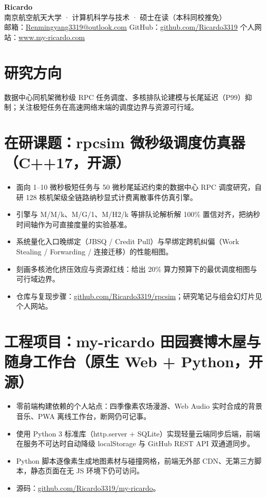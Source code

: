 \documentclass[11pt,a4paper]{article}
\begin{document}
{\Huge\bfseries Ricardo}\\[5pt]
{\large 南京航空航天大学 · 计算机科学与技术 · 硕士在读（本科同校推免）}\\[4pt]
{\small\color{soft}
  邮箱：\href{mailto:Renmingyang3319@outlook.com}{Renmingyang3319@outlook.com} \quad
  GitHub：\href{https://github.com/Ricardo3319}{github.com/Ricardo3319} \quad
  个人网站：\href{https://www.my-ricardo.com}{www.my-ricardo.com}
}

\section{研究方向}
数据中心同机架微秒级 RPC 任务调度、多核排队论建模与长尾延迟（P99）抑制；关注极短任务在高速网络末端的调度边界与资源可行域。

\section{在研课题：rpcsim 微秒级调度仿真器（C++17，开源）}
\begin{itemize}
  \item 面向 1--10 微秒极短任务与 50 微秒尾延迟约束的数据中心 RPC 调度研究，自研 128 核机架级全链路纳秒显式计费离散事件仿真引擎。
  \item 引擎与 M/M/k、M/G/1、M/H2/k 等排队论解析解 100\% 置信对齐，把纳秒时间轴作为可直接度量的实验基准。
  \item 系统量化入口晚绑定（JBSQ / Credit Pull）与早绑定跨机纠偏（Work Stealing / Forwarding / 连接迁移）的性能相图。
  \item 刻画多核池化挤压效应与资源红线：给出 20\% 算力预算下的最优调度相图与可行域边界。
  \item 仓库与复现步骤：\href{https://github.com/Ricardo3319/rpcsim}{github.com/Ricardo3319/rpcsim}；研究笔记与组会幻灯片见个人网站。
\end{itemize}

\section{工程项目：my-ricardo 田园赛博木屋与随身工作台（原生 Web + Python，开源）}
\begin{itemize}
  \item 零前端构建依赖的个人站点：四季像素农场漫游、Web Audio 实时合成的背景音乐、PWA 离线工作台，断网仍可记事。
  \item 使用 Python 3 标准库（http.server + SQLite）实现轻量云端同步后端，前端在服务不可达时自动降级 localStorage 与 GitHub REST API 双通道同步。
  \item Python 脚本逐像素生成地图素材与碰撞网格，前端无外部 CDN、无第三方脚本，静态页面在无 JS 环境下仍可访问。
  \item 源码：\href{https://github.com/Ricardo3319/my-ricardo}{github.com/Ricardo3319/my-ricardo}。
\end{itemize}
\end{document}
